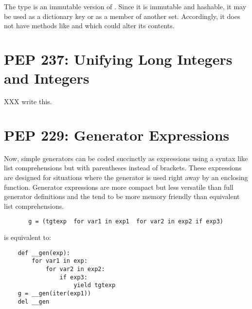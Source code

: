 \documentclass{howto}
\begin{document}
The type  is an immutable version of .
Since it is immutable and hashable, it may be used as a dictionary key or
as a member of another set.  Accordingly, it does not have methods
like  and  which could alter its contents.


\begin{seealso}
\end{seealso}

\section{PEP 237: Unifying Long Integers and Integers}

XXX write this.

\section{PEP 229: Generator Expressions}

Now, simple generators can be coded succinctly as expressions using a syntax
like list comprehensions but with parentheses instead of brackets.  These
expressions are designed for situations where the generator is used right
away by an enclosing function.  Generator expressions are more compact but
less versatile than full generator definitions and the tend to be more memory
friendly than equivalent list comprehensions.
       
\begin{verbatim}
       g = (tgtexp  for var1 in exp1  for var2 in exp2 if exp3)
\end{verbatim}
       
is equivalent to:

\begin{verbatim}
    def __gen(exp):
        for var1 in exp:
            for var2 in exp2:
                if exp3:
                    yield tgtexp
    g = __gen(iter(exp1))
    del __gen
\end{verbatim}
\end{document}
